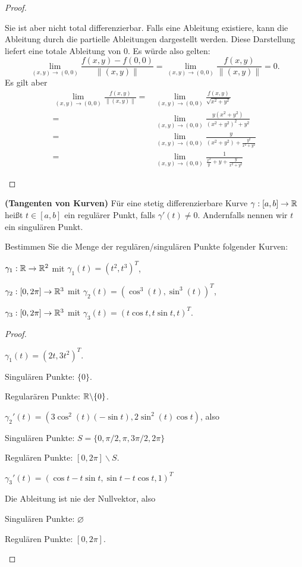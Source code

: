 \begin{proof}
\begin{parts}
	Sie ist aber nicht total differenzierbar. Falls eine Ableitung existiere, kann die Ableitung durch die partielle Ableitungen dargestellt werden. Diese Darstellung liefert eine totale Ableitung von $0$. Es würde also gelten:
	\[
		\lim_{(x,y) \to (0,0)} \frac{f(x,y)-f(0,0)}{\|(x,y)\|}=\lim_{(x,y) \to (0,0)} \frac{f(x,y)}{\|(x,y)\|}= 0
	.\]
	Es gilt aber
	\begin{align*}
		\lim_{(x,y) \to (0,0)} \frac{f(x,y)}{\|(x,y)\|}=& \lim_{(x,y) \to (0,0)}  \frac{f(x,y)}{\sqrt{x^2+y^2} }\\
		=&\lim_{(x,y) \to (0,0)} \frac{y(x^2+y^2)}{(x^2+y^2)^2+y^2}\\
		=&\lim_{(x,y) \to (0,0)} \frac{y}{(x^2+y^2)+\frac{y^2}{x^2+y^2}}\\
		=&\lim_{(x,y) \to (0,0)} \frac{1}{\frac{x^2}{y}+y+\frac{y}{x^2+y^2}}
	\end{align*}
	\end{parts}
\end{proof}
\begin{Problem}
	\textbf{(Tangenten von Kurven)} Für eine stetig differenzierbare Kurve $\gamma:[a,b]\to \mathbb{R}$ heißt $t\in [a,b]$ ein regulärer Punkt, falls $\gamma'(t)\neq 0$. Andernfalls nennen wir $t$ ein singulären Punkt.

Bestimmen Sie die Menge der regulären/singulären Punkte folgender Kurven:	
\begin{parts}
\item $\gamma_1:\mathbb{R}\to \mathbb{R}^2$ mit $\gamma_1(t)=(t^2,t^3)^T$,
\item $\gamma_2:[0,2\pi]\to \mathbb{R}^3$ mit $\gamma_2(t)=(\cos^3(t),\sin^3(t))^T$,
\item $\gamma_3:[0,2\pi]\to \mathbb{R}^3$ mit $\gamma_3(t)=(t\cos t,t\sin t, t)^T$.
\end{parts}
\end{Problem}
\begin{proof}
	\begin{parts}
	\item $\gamma_1(t)=(2t,3t^2)^T$.

		Singulären Punkte: $\{0\} $.
		
		Regularären Punkte: $\mathbb{R}\backslash \{0\} $.
	\item $\gamma_2'(t)=(3\cos^2(t)(-\sin t), 2\sin^2(t)\cos t)$, also

		Singulären Punkte: $S=\{0,\pi / 2, \pi, 3\pi / 2, 2\pi\} $

		Regulären Punkte: $[0,2\pi] \backslash S$.
	\item  $\gamma_3'(t)=(\cos t-t\sin t,\sin t-t\cos t,1)^T$

		Die Ableitung ist nie der Nullvektor, also

		Singulären Punkte: $\varnothing$ 

		Regulären Punkte: $[0,2\pi]$.\qedhere
	\end{parts}
\end{proof}
